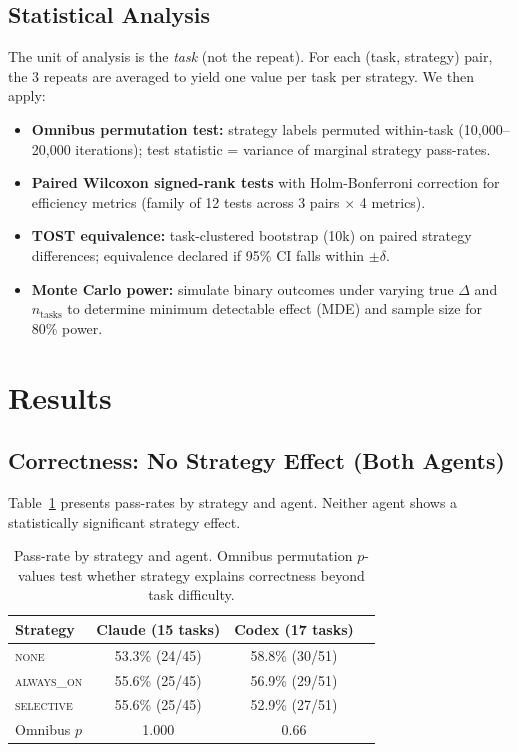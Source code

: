 \documentclass[11pt]{article}
\newcommand{\none}{\textsc{none}}
\newcommand{\alwayson}{\textsc{always\_on}}
\newcommand{\selective}{\textsc{selective}}
\begin{document}
\subsection{Statistical Analysis}

The unit of analysis is the \emph{task} (not the repeat).
For each (task, strategy) pair, the 3 repeats are averaged to yield one value per task per strategy.
We then apply:
\begin{itemize}
    \item \textbf{Omnibus permutation test:} strategy labels permuted within-task (10,000--20,000 iterations); test statistic = variance of marginal strategy pass-rates.
    \item \textbf{Paired Wilcoxon signed-rank tests} with Holm-Bonferroni correction for efficiency metrics (family of 12 tests across 3 pairs $\times$ 4 metrics).
    \item \textbf{TOST equivalence:} task-clustered bootstrap (10k) on paired strategy differences; equivalence declared if 95\% CI falls within $\pm\delta$.
    \item \textbf{Monte Carlo power:} simulate binary outcomes under varying true $\Delta$ and $n_{\text{tasks}}$ to determine minimum detectable effect (MDE) and sample size for 80\% power.
\end{itemize}

\section{Results}

\subsection{Correctness: No Strategy Effect (Both Agents)}

Table~\ref{tab:correctness} presents pass-rates by strategy and agent.
Neither agent shows a statistically significant strategy effect.

\begin{table}[t]
\centering
\small
\caption{Pass-rate by strategy and agent. Omnibus permutation $p$-values test whether strategy explains correctness beyond task difficulty.}
\label{tab:correctness}
\begin{tabular}{lccc}
\toprule
\textbf{Strategy} & \textbf{Claude (15 tasks)} & \textbf{Codex (17 tasks)} \\
\midrule
\none        & 53.3\% (24/45) & 58.8\% (30/51) \\
\alwayson    & 55.6\% (25/45) & 56.9\% (29/51) \\
\selective   & 55.6\% (25/45) & 52.9\% (27/51) \\
\midrule
Omnibus $p$  & 1.000          & 0.66 \\
\bottomrule
\end{tabular}
\end{table}
\end{document}
